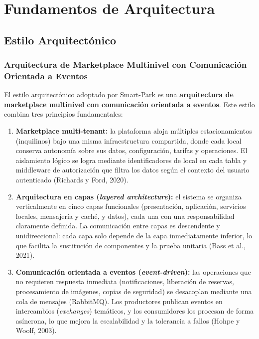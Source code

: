 
\section{Fundamentos de Arquitectura}

\subsection{Estilo Arquitectónico}

\subsubsection{Arquitectura de Marketplace Multinivel con Comunicación Orientada a Eventos}

El estilo arquitectónico adoptado por Smart-Park es una \textbf{arquitectura de marketplace multinivel con comunicación orientada a eventos}. Este estilo combina tres principios fundamentales:

\begin{enumerate}
    \item \textbf{Marketplace multi-tenant:} la plataforma aloja múltiples estacionamientos (inquilinos) bajo una misma infraestructura compartida, donde cada local conserva autonomía sobre sus datos, configuración, tarifas y operaciones. El aislamiento lógico se logra mediante identificadores de local en cada tabla y middleware de autorización que filtra los datos según el contexto del usuario autenticado (Richards y Ford, 2020).
    \item \textbf{Arquitectura en capas (\textit{layered architecture}):} el sistema se organiza verticalmente en cinco capas funcionales (presentación, aplicación, servicios locales, mensajería y caché, y datos), cada una con una responsabilidad claramente definida. La comunicación entre capas es descendente y unidireccional: cada capa solo depende de la capa inmediatamente inferior, lo que facilita la sustitución de componentes y la prueba unitaria (Bass et al., 2021).
    \item \textbf{Comunicación orientada a eventos (\textit{event-driven}):} las operaciones que no requieren respuesta inmediata (notificaciones, liberación de reservas, procesamiento de imágenes, copias de seguridad) se desacoplan mediante una cola de mensajes (RabbitMQ). Los productores publican eventos en intercambios (\textit{exchanges}) temáticos, y los consumidores los procesan de forma asíncrona, lo que mejora la escalabilidad y la tolerancia a fallos (Hohpe y Woolf, 2003).
\end{enumerate}

